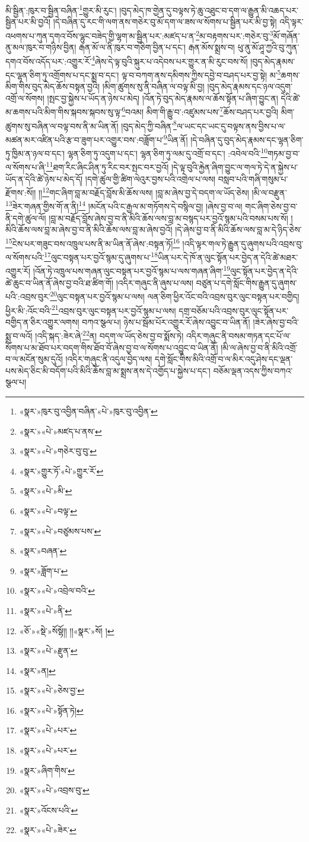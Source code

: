 མི་སྦྱིན་:ཁུར་བ་སྦྱིན་བཞིན་\footnote{«སྣར་»ཁུར་བུ་འབྱིན་བཞིན་«པེ་»ཁུར་བུ་འབྱིན་}གྱུར་མི་རུང་། །བུད་མེད་ཁ་གྱེན་དུ་བལྟས་ཏེ་ཆུ་འཐུང་བ་དག་ལ་རྒྱུན་མི་འཆད་པར་སྦྱིན་པར་མི་བྱའོ། །དེ་བཞིན་དུ་རང་གི་ལག་ནས་གཅེར་བུ་མོ་དག་ལ་ཟས་ལ་སོགས་པ་སྦྱིན་པར་མི་བྱ་སྟེ། འདི་ལྟར་འཕགས་པ་ཀུན་དགའ་བོས་ལྷུང་བཟེད་གྱི་ལྷག་མ་སྦྱིན་པར་:མཛད་པ་ན་\footnote{«སྣར་»«པེ་»མཛད་པ་ནས་}མ་བརྟགས་པར་:གཅེར་བུ་\footnote{«སྣར་»«པེ་»གཅེར་བུ་བུ་}མོ་གཞོན་ནུ་མལ་ཁུར་བ་གཉིས་བྱིན། རྒན་མོ་ལ་ནི་ཁུར་བ་གཅིག་བྱིན་པ་དང་། རྒན་མོས་སྨྲས་བ། ཕུ་ནུ་མོ་ཤཱ་ཀྱའི་བུ་ཀུན་དགའ་བོས་འདོད་པར་:འགྱུར་རོ་\footnote{«སྣར་»གྱུར་ཏོ་«པེ་»གྱུར་རོ་}ཞེས་དེ་ལྟ་བུའི་སྐུར་པ་འདེབས་པར་གྱུར་ན་མི་རུང་བས་སོ། །བུད་མེད་རྣམས་དང་ལྷན་ཅིག་ཏུ་འགྲོགས་པ་དང་སྨྲ་བ་དང་། ལྟ་བ་བཀག་ནས་དམིགས་ཀྱིས་དབྱེ་བ་བཤད་པར་བྱ་སྟེ། མ་\footnote{«སྣར་»«པེ་»མི་}ཆགས་མིག་གིས་བུད་མེད་ཆོས་བསྟན་བྱའི། །མིག་ཚུགས་སུ་ནི་བཞིན་ལ་བལྟ་མི་བྱ། །བུད་མེད་རྣམས་དང་ཉལ་འདུག་འགྲོ་ལ་སོགས། །སྤང་བྱ་སྐྱེས་པ་ཡོད་ན་ཉེས་པ་མེད། །འོན་ཏེ་བུད་མེད་རྣམས་ལ་ཆོས་སྟོན་པ་ཞིག་བྱུང་ན། དེའི་ཚེ་མ་ཆགས་པའི་མིག་གིས་སྐབས་སྐབས་སུ་ལྟ་\footnote{«སྣར་»«པེ་»བལྟ་}བའམ། མིག་གི་རྒྱུ་བ་:འཛུམས་པས་\footnote{«སྣར་»«པེ་»བཙུམས་པས་}ཆོས་བཤད་པར་བྱའི། མིག་ཚུགས་སུ་བཞིན་ལ་བལྟ་བས་ནི་མ་ཡིན་ནོ། །བུད་མེད་ཀྱི་བཞིན་\footnote{«སྣར་»བཞན་}ལ་ཡང་དང་ཡང་དུ་བལྟས་ནས་བྱིས་པ་ལ་མཚན་མར་འཛིན་པའི་རྩ་བ་ཟུག་པར་འགྱུར་བས་:བཟློག་པ་\footnote{«སྣར་»ཟློག་པ་}ཡིན་ནོ། །དེ་བཞིན་དུ་བུད་མེད་རྣམས་དང་ལྷན་ཅིག་ཏུ་ཁྱིམ་ན་ཉལ་བ་དང་། ལྷན་ཅིག་ཏུ་འདུག་པ་དང་། ལྷན་ཅིག་ཏུ་ལམ་དུ་འགྲོ་བ་དང་། :འབེལ་བའི་\footnote{«སྣར་»«པེ་»འབྲེལ་བའི་}གཏམ་བྱ་བ་ལ་སོགས་པ་ཞི་\footnote{«སྣར་»«པེ་»ནི་}ཐག་རིང་ཞིང་ཤིན་ཏུ་རིང་བར་སྤང་བར་བྱའོ། །དེ་ལྟ་བུའི་རྐྱེན་ཞིག་བྱུང་ལ་གལ་ཏེ་དེ་ན་སྐྱེས་པ་ཡོད་ན་དེའི་ཚེ་ཉེས་པ་མེད་དོ། །དགེ་ཚུལ་གྱི་ཚིག་ལེའུར་བྱས་པའི་འགྲེལ་པ་ལས། བསླབ་པའི་གཞི་གསུམ་པ་རྫོགས་:སོ།། །།\footnote{«ཅོ་»«སྡེ་»སོསྷོ།། །།«སྣར་»སོ། །}གང་ཞིག་བླ་མ་བརྗོད་བློས་མི་ཆོས་ལས། །བླ་མ་ཞེས་བྱ་དེ་བདག་ལ་ཡོད་ཅེས། །མི་ལ་བརྫུན་\footnote{«སྣར་»«པེ་»རྫུན་}ཟེར་གཞན་གྱིས་གོ་ན་ནི།\footnote{«སྣར་»ན།} །མངོན་པའི་ང་རྒྱལ་མ་གཏོགས་དེ་བསྙིལ་བྱ། །ཞེས་བྱ་བ་ལ། གང་ཞིག་ཅེས་བྱ་བ་ནི་དགེ་ཚུལ་ལོ། །བླ་མ་བརྗོད་བློས་ཞེས་བྱ་བ་ནི་མིའི་ཆོས་ལས་བླ་མ་བསྙད་པར་བྱའོ་སྙམ་པའི་བསམ་པས་སོ། །མིའི་ཆོས་ལས་བླ་མ་ཞེས་བྱ་བ་ནི་མིའི་ཆོས་ལས་བླ་མ་ཞེས་བྱའོ། །དེ་ཞེས་བྱ་བ་ནི་མིའི་ཆོས་ལས་བླ་མ་དེ་ཉིད་ཅེས་\footnote{«སྣར་»«པེ་»ཅེས་བྱ་}ངེས་པར་གཟུང་བས་འཁྲུལ་པས་ནི་མ་ཡིན་ནོ་ཞེས་:བསྟན་ཏོ།\footnote{«སྣར་»«པེ་»སྟོན་ཏེ།} །འདི་ལྟར་གལ་ཏེ་རྒྱུན་དུ་ཞུགས་པའི་འབྲས་བུ་ལ་སོགས་པའི་\footnote{«སྣར་»«པེ་»པར་}ལུང་བསྟན་པར་བྱའོ་སྙམ་དུ་ཞུགས་པ་\footnote{«སྣར་»«པེ་»པར་}ཡིན་པར་དེ་ཁོ་ན་ལུང་སྟོན་པར་བྱེད་ན་དེའི་ཚེ་མཐར་འགྱུར་རོ། །འོན་ཏེ་འཁྲུལ་པས་གཞན་ལུང་བསྟན་པར་བྱའོ་སྙམ་པ་ལས་གཞན་ཞིག་\footnote{«སྣར་»ཞིག་གིས་}ལུང་སྟོན་པར་བྱེད་ན་དེའི་ཚེ་ཆུང་བ་ཡིན་ནོ་ཞེས་བྱ་བའི་ཐ་ཚིག་གོ། །འདིར་གཞུང་ནི་ཞུས་པ་ལས། བཙུན་པ་དགེ་སློང་གིས་རྒྱུན་དུ་ཞུགས་པའི་:འབྲས་བུར་\footnote{«སྣར་»«པེ་»འབྲས་བུ་}ལུང་བསྟན་པར་བྱའོ་སྙམ་པ་ལས། ལན་ཅིག་ཕྱིར་འོང་བའི་འབྲས་བུར་ལུང་བསྟན་པར་བགྱིད། ཕྱིར་མི་:འོང་བའི་\footnote{«སྣར་»འོངས་པའི་}འབྲས་བུར་ལུང་བསྟན་པར་བྱའོ་སྙམ་པ་ལས། དགྲ་བཅོམ་པའི་འབྲས་བུར་ལུང་སྟོན་པར་བགྱིད་ན་ཅིར་འགྱུར་ལགས། བཀའ་སྩལ་པ། ཉེས་པ་སྦོམ་པོར་འགྱུར་རོ་ཞེས་འབྱུང་བ་ཡིན་ནོ། །ཟེར་ཞེས་བྱ་བའི་སྨྲ་བ་ལའོ། །འདི་སྐད་:ཟེར་ཞེ་\footnote{«སྣར་»«པེ་»ཟེར་}ན། བདག་ལ་ཡོད་ཅེས་བྱ་བ་སྨོས་ཏེ། འདིར་གཞུང་ནི་བསམ་གཏན་དང་པོ་ལ་སོགས་པ་མ་ཐོབ་པར་བདག་གིས་ཐོབ་བོ་ཞེས་བྱ་བ་ལ་སོགས་པ་འབྱུང་བ་ཡིན་ནོ། །མི་ལ་ཞེས་བྱ་བ་ནི་མིའི་འགྲོ་བ་ལ་མངོན་སུམ་དུའོ། །འདིར་གཞུང་ནི་འདུལ་བྱེད་ལས། དགེ་སློང་གིས་མིའི་འགྲོ་བ་ལ་མིར་འདུ་ཤེས་དང་ལྡན་པས་མེད་ཅིང་མི་བདོག་པའི་མིའི་ཆོས་བླ་མ་སྨྲས་ནས་དེ་འགྱོད་པ་སྐྱེས་པ་དང་། བཅོམ་ལྡན་འདས་ཀྱིས་བཀའ་སྩལ་པ། 